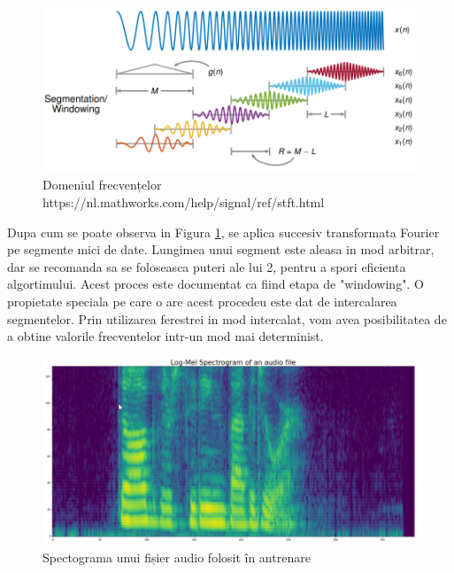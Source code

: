 \documentclass[a4paper, 12pt]{report}
\begin{document}
	\begin{figure}[H]
		\begin{center}
			\includegraphics[width=\linewidth]{images/windowing.PNG}	
		\end{center}
		\caption{Domeniul frecvențelor \newline
			\hspace{\linewidth}https://nl.mathworks.com/help/signal/ref/stft.html}
		\label{fig:windowing}
	\end{figure}

	Dupa cum se poate observa in Figura \ref{fig:windowing}, se aplica succesiv transformata Fourier pe segmente mici de date. Lungimea unui segment este aleasa in mod arbitrar, dar se recomanda sa se foloseasca puteri ale lui 2, pentru a spori eficienta algortimului. Acest proces este documentat ca fiind etapa de "windowing". O propietate speciala pe care o are acest procedeu este dat de intercalarea segmentelor. Prin utilizarea ferestrei in mod intercalat, vom avea posibilitatea de a obtine valorile frecventelor intr-un mod mai determinist.
	
	\begin{figure}[H]
		\begin{center}
			\includegraphics[width=\linewidth]{images/spectogram.PNG}	
		\end{center}
		\caption{Spectograma unui fișier audio folosit în antrenare}
		\label{fig:spectogram}
	\end{figure} 
\end{document}
